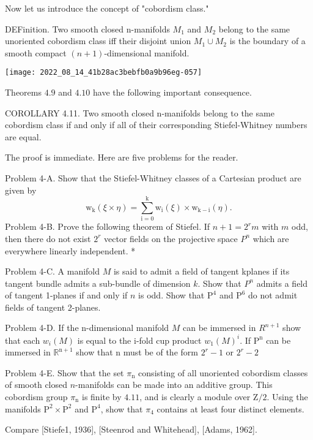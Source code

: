 \documentclass[10pt]{article}
\begin{document}
Now let us introduce the concept of "cobordism class."

DEFinition. Two smooth closed n-manifolds $M_{1}$ and $M_{2}$ belong to the same unoriented cobordism class iff their disjoint union $M_{1} \cup M_{2}$ is the boundary of a smooth compact $(n+1)$-dimensional manifold.

\texttt{[image: 2022\_08\_14\_41b28ac3bebfb0a9b96eg-057]}

Theorems $4.9$ and $4.10$ have the following important consequence.

COROLLARY 4.11. Two smooth closed n-manifolds belong to the same cobordism class if and only if all of their corresponding Stiefel-Whitney numbers are equal.

The proof is immediate. Here are five problems for the reader.

Problem 4-A. Show that the Stiefel-Whitney classes of a Cartesian product are given by
$$
\mathrm{w}_{\mathrm{k}}(\xi \times \eta)=\sum_{\mathrm{i}=0}^{\mathrm{k}} \mathrm{w}_{\mathrm{i}}(\xi) \times \mathrm{w}_{\mathrm{k}-\mathrm{i}}(\eta) .
$$
Problem 4-B. Prove the following theorem of Stiefel. If $n+1=2^{r} m$ with $m$ odd, then there do not exist $2^{r}$ vector fields on the projective space $P^{n}$ which are everywhere linearly independent. *

Problem 4-C. A manifold $M$ is said to admit a field of tangent kplanes if its tangent bundle admits a sub-bundle of dimension $k$. Show that $P^{n}$ admits a field of tangent 1-planes if and only if $n$ is odd. Show that $\mathrm{P}^{4}$ and $\mathrm{P}^{6}$ do not admit fields of tangent 2-planes.

Problem 4-D. If the n-dimensional manifold $M$ can be immersed in $R^{n+1}$ show that each $w_{i}(M)$ is equal to the i-fold cup product $w_{1}(M)^{i}$. If $\mathrm{P}^{\mathrm{n}}$ can be immersed in $\mathbb{R}^{\mathrm{n}+1}$ show that $\mathrm{n}$ must be of the form $2^{r}-1$ or $2^{r}-2$

Problem 4-E. Show that the set $\pi_{\mathrm{n}}$ consisting of all unoriented cobordism classes of smooth closed $n$-manifolds can be made into an additive group. This cobordism group $\pi_{\mathrm{n}}$ is finite by $4.11$, and is clearly a module over $\mathrm{Z} / 2$. Using the manifolds $\mathrm{P}^{2} \times \mathrm{P}^{2}$ and $\mathrm{P}^{4}$, show that $\pi_{4}$ contains at least four distinct elements.

Compare [Stiefe1, 1936], [Steenrod and Whitehead], [Adams, 1962].
\end{document}
